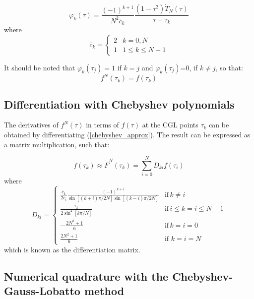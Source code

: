 \documentclass[a4paper,11pt]{report}    %
\begin{document}
\begin{equation}
  \varphi_k(\tau) = \frac{(-1)^{k+1}}{N^2 \bar c_k} \frac{(1-\tau^2) \dot T_N(\tau)}{\tau-\tau_k}
\end{equation}
where
\begin{equation}
   \bar c_k = \left\{ \begin{array}{ll} 2 & k=0,N \\ 1 & 1\le k\le N-1 \end{array} \right.
\end{equation}

It should be noted that $\varphi_k(\tau_j)=1$ if $k=j$ and $\varphi_k(\tau_j)$=0, if $k\ne j$, so that:
\begin{equation} \label{eq:colloc_chev}
f^N(\tau_k) = f(\tau_k)
\end{equation}




\subsection{Differentiation with Chebyshev polynomials}

The derivatives of $f^N(\tau)$ in terms of $f(\tau)$ at the CGL points $\tau_k$ can be obtained
by differentiating (\ref{chebyshev_approx}). The result can be expressed as a matrix
multiplication, such that:

\begin{equation} \label{fdot_approx_cheb}
  \dot f(\tau_k) \approx \dot F^N(\tau_k) = \sum \limits_{i=0}^N D_{ki} f(\tau_i)
\end{equation}
where 
\begin{equation} \label{eq:diff_mat_cheb}
   D_{ki} = \left\{ \begin{matrix} \frac{\bar c_k }{2 \bar c_i } \frac{(-1)^{k+i}}{\sin[(k+i)\pi/2N] \sin[(k-i)\pi/2N]} & \mathrm{if} \, k\ne i \\
                    \frac{\tau_k}{2\sin^2[k\pi/N]} & \mathrm{if} \, i\le k=i \le N-1 \\
                    -\frac{2N^2+1}{6} & \mathrm{if} \, k=i=0 \\
                       \frac{2N^2+1}{6}    & \mathrm{if} \,\, k=i=N  \end{matrix}  \right.
\end{equation}
which is known as the differentiation matrix.




\subsection{Numerical quadrature with the Chebyshev-Gauss-Lobatto method}
\end{document}
